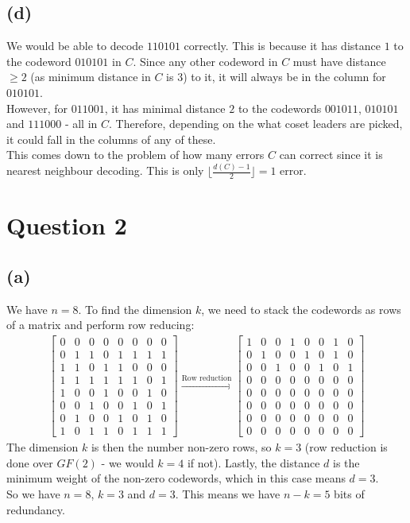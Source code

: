 \documentclass[a4paper, fleqn]{article}
\begin{document}
\subsection*{(d)}
We would be able to decode $110101$ correctly. This is because it has distance $1$ to the
codeword $010101$ in $C$. Since any other codeword in $C$ must have distance $\geq 2$ (as
minimum distance in $C$ is $3$) to it, it will always be in the column for $010101$. \\
However, for $011001$, it has minimal distance $2$ to the codewords $001011$, $010101$
and $111000$ - all in $C$. Therefore, depending on the what coset leaders are picked, it
could fall in the columns of any of these. \\
This comes down to the problem of how many errors $C$ can correct since it is nearest
neighbour decoding. This is only $\lfloor \frac{d(C)-1}{2}\rfloor=1$ error.

\section*{Question 2}
\subsection*{(a)}
We have $n=8$. To find the dimension $k$, we need to stack the codewords as rows of a
matrix and perform row reducing:
\begin{align*}
  \begin{bmatrix}
    0 & 0 & 0 & 0 & 0 & 0 & 0 & 0 \\
    0 & 1 & 1 & 0 & 1 & 1 & 1 & 1 \\
    1 & 1 & 0 & 1 & 1 & 0 & 0 & 0 \\
    1 & 1 & 1 & 1 & 1 & 1 & 0 & 1 \\
    1 & 0 & 0 & 1 & 0 & 0 & 1 & 0 \\
    0 & 0 & 1 & 0 & 0 & 1 & 0 & 1 \\
    0 & 1 & 0 & 0 & 1 & 0 & 1 & 0 \\
    1 & 0 & 1 & 1 & 0 & 1 & 1 & 1
  \end{bmatrix}\xrightarrow{\mbox{Row reduction}}
  \begin{bmatrix}
    1 & 0 & 0 & 1 & 0 & 0 & 1 & 0 \\
    0 & 1 & 0 & 0 & 1 & 0 & 1 & 0 \\
    0 & 0 & 1 & 0 & 0 & 1 & 0 & 1 \\
    0 & 0 & 0 & 0 & 0 & 0 & 0 & 0 \\
    0 & 0 & 0 & 0 & 0 & 0 & 0 & 0 \\
    0 & 0 & 0 & 0 & 0 & 0 & 0 & 0 \\
    0 & 0 & 0 & 0 & 0 & 0 & 0 & 0 \\
    0 & 0 & 0 & 0 & 0 & 0 & 0 & 0
  \end{bmatrix}
\end{align*}
The dimension $k$ is then the number non-zero rows, so $k=3$ (row reduction is done over
$GF(2)$ - we would $k=4$ if not). Lastly, the distance $d$ is
the minimum weight of the non-zero codewords, which in this case means $d=3$. \\
So we have $n=8$, $k=3$ and $d=3$. This means we have $n-k=5$ bits of redundancy.
\end{document}
